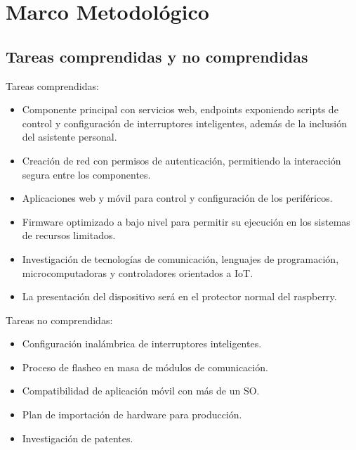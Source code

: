 \chapter{Marco Metodológico}

\section{Tareas comprendidas y no comprendidas}
Tareas comprendidas:

\begin{itemize}

\item Componente principal con servicios web, endpoints exponiendo scripts de control y
configuración de interruptores inteligentes, además de la inclusión del asistente personal.

\item Creación de red con permisos de autenticación, permitiendo la interacción segura entre los componentes.

\item Aplicaciones web y móvil para control y configuración de los periféricos.

\item Firmware optimizado a bajo nivel para permitir su ejecución en los sistemas de recursos limitados.

\item Investigación de tecnologías de comunicación, lenguajes de programación,
microcomputadoras y controladores orientados a IoT.

\item La presentación del dispositivo será en el protector normal del raspberry.

\end{itemize}

Tareas no comprendidas:

\begin{itemize}

\item Configuración inalámbrica de interruptores inteligentes.

\item Proceso de flasheo en masa de módulos de comunicación.

\item Compatibilidad de aplicación móvil con más de un SO.

\item Plan de importación de hardware para producción.

\item Investigación de patentes.

\end{itemize}


